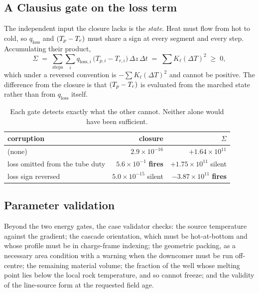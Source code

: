 \subsection{A Clausius gate on the loss term}

The independent input the closure lacks is the \emph{state}. Heat must flow
from hot to cold, so $q_{\mathrm{loss}}$ and $(T_{p} - T_{r})$ must share a
sign at every segment and every step. Accumulating their product,
\begin{equation}
\Sigma \;=\; \sum_{\text{steps}}\sum_{i}
  q_{\mathrm{loss},i}\,\big(T_{p,i} - T_{r,i}\big)\,\Delta z\,\Delta t
  \;=\; \sum K_\ell (\Delta T)^{2} \;\ge\; 0 ,
\end{equation}
which under a reversed convention is $-\sum K_\ell(\Delta T)^2$ and cannot be
positive. The difference from the closure is that $(T_{p} - T_{r})$ is
evaluated from the marched state rather than from $q_{\mathrm{loss}}$ itself.

\begin{table}[h]
\centering
\begin{tabular}{lrr}
\toprule
corruption & closure & $\Sigma$ \\
\midrule
(none)                           & $2.9\times10^{-16}$ & $+1.64\times10^{11}$ \\
loss omitted from the tube duty  & $5.6\times10^{-1}$ \textbf{fires} & $+1.75\times10^{11}$ silent \\
loss sign reversed               & $5.0\times10^{-15}$ silent & $-3.87\times10^{11}$ \textbf{fires} \\
\bottomrule
\end{tabular}
\caption{Each gate detects exactly what the other cannot. Neither alone would
have been sufficient.}
\end{table}

\subsection{Parameter validation}

Beyond the two energy gates, the case validator checks: the source temperature
against the gradient; the cascade orientation, which must be hot-at-bottom and
whose profile must be in charge-frame indexing; the geometric packing, as a
necessary area condition with a warning when the downcomer must be run
off-centre; the remaining material volume; the fraction of the well whose
melting point lies below the local rock temperature, and so cannot freeze; and
the validity of the line-source form at the requested field age.

